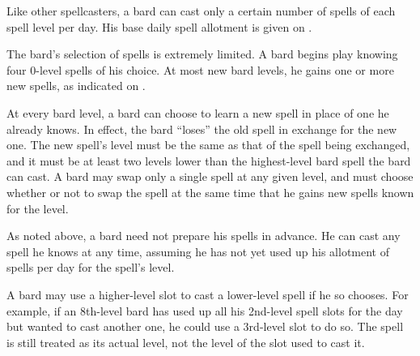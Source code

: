 Like other spellcasters, a bard can cast only a certain number of spells of each spell level per day. His base daily spell allotment is given on .

The bard's selection of spells is extremely limited. A bard begins play knowing four 0-level spells of his choice. At most new bard levels, he gains one or more new spells, as indicated on .

At every bard level, a bard can choose to learn a new spell in place of one he already knows. In effect, the bard ``loses'' the old spell in exchange for the new one. The new spell's level must be the same as that of the spell being exchanged, and it must be at least two levels lower than the highest-level bard spell the bard can cast. A bard may swap only a single spell at any given level, and must choose whether or not to swap the spell at the same time that he gains new spells known for the level.

As noted above, a bard need not prepare his spells in advance. He can cast any spell he knows at any time, assuming he has not yet used up his allotment of spells per day for the spell's level.

 \par A bard may use a higher-level slot to cast a lower-level spell if he so chooses. For example, if an 8th-level bard has used up all his 2nd-level spell slots for the day but wanted to cast another one, he could use a 3rd-level slot to do so. The spell is still treated as its actual level, not the level of the slot used to cast it.

